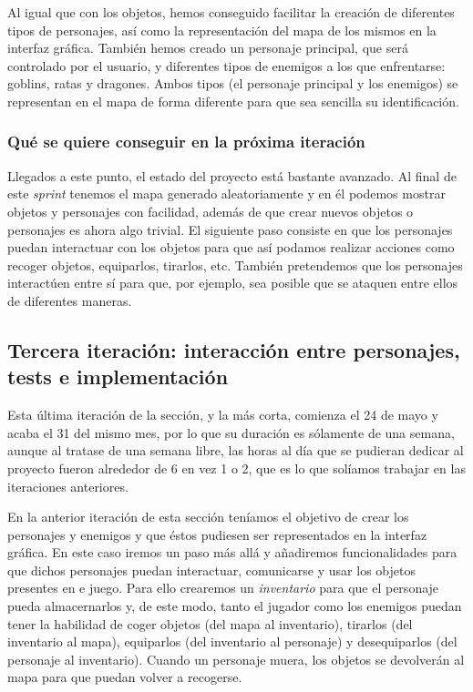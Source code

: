 Al igual que con los objetos, hemos conseguido facilitar la creación de diferentes tipos de personajes, así como la representación del mapa de los mismos en la interfaz gráfica. 
También hemos creado un personaje principal, que será controlado por el usuario, y diferentes tipos de enemigos a los que enfrentarse: goblins, ratas y dragones. Ambos tipos (el personaje principal y los enemigos) se representan en el mapa de forma diferente para que sea sencilla su identificación.

\subsubsection{Qué se quiere conseguir en la próxima iteración}

Llegados a este punto, el estado del proyecto está bastante avanzado. Al final de este \textit{sprint} tenemos el mapa generado aleatoriamente y en él podemos mostrar objetos y personajes con facilidad, además de que crear nuevos objetos o personajes es ahora algo trivial. El siguiente paso consiste en que los personajes puedan interactuar con los objetos para que así podamos realizar acciones como recoger objetos, equiparlos, tirarlos, etc. También pretendemos que los personajes interactúen entre sí para que, por ejemplo, sea posible que se ataquen entre ellos de diferentes maneras.

\subsection{Tercera iteración: interacción entre personajes, tests e implementación}

Esta última iteración de la sección, y la más corta, comienza el 24 de mayo y acaba el 31 del mismo mes, por lo que su duración es sólamente de una semana, aunque al tratase de una semana libre, las horas al día que se pudieran dedicar al proyecto fueron alrededor de 6 en vez 1 o 2, que es lo que solíamos trabajar en las iteraciones anteriores.

En la anterior iteración de esta sección teníamos el objetivo de crear los personajes y enemigos y que éstos pudiesen ser representados en la interfaz gráfica. En este caso iremos un paso más allá y añadiremos funcionalidades para que dichos personajes puedan interactuar, comunicarse y usar los objetos presentes en e juego. Para ello crearemos un \textit{inventario} para que el personaje pueda almacernarlos y, de este modo, tanto el jugador como los enemigos puedan tener la habilidad de coger objetos (del mapa al inventario), tirarlos (del inventario al mapa), equiparlos (del inventario al personaje) y desequiparlos (del personaje al inventario). Cuando un personaje muera, los objetos se devolverán al mapa para que puedan volver a recogerse.


